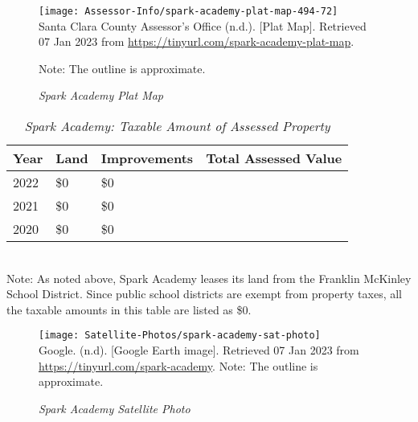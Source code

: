 \begin{figure}[hbt]
    \caption[Spark Academy Plat Map]{\textit{Spark Academy Plat Map}}\label{fig:spark-academy-plat-map}
    \texttt{[image: Assessor-Info/spark-academy-plat-map-494-72]}\\ %
    \footnotesize{Santa Clara County Assessor's Office (n.d.). [Plat Map]. Retrieved 07 Jan 2023 from  \url{https://tinyurl.com/spark-academy-plat-map}}.
    
    \noindent\footnotesize{Note: The outline is approximate.}
  \end{figure}

\begin{table}[hbt]
  \SingleSpacing%
  \caption[Spark Academy: Taxable Amount of Assessed Propery]{\textit{Spark Academy: Taxable Amount of Assessed Property}}\label{tab:spark-academy-taxable-amount}
  \begin{tabular}{llll}
    \toprule
    Year & Land        & Improvements & Total Assessed Value \\
    \midrule
    2022 & \$0         & \$0          & \\
    2021 & \$0         & \$0          & \\
    2020 & \$0         & \$0          & \\
    \bottomrule
  \end{tabular}\\
  \noindent\footnotesize{Note: As noted above, Spark Academy leases its land from the Franklin McKinley School District. Since public school districts are exempt from property taxes, all the taxable amounts in this table are listed as \$0.}
\end{table}

\begin{figure}[hbt]
  \centering
  \caption[Spark Academy Satellite Photo] {\textit{Spark Academy Satellite Photo}}\label{fig:spark-academy-sat-photo}
  \texttt{[image: Satellite-Photos/spark-academy-sat-photo]}\\ %
  \footnotesize{Google. (n.d). [Google Earth image]. Retrieved 07 Jan 2023 from \url{https://tinyurl.com/spark-academy}.}
  \noindent\footnotesize{Note: The outline is approximate.}
\end{figure}


\clearpage


